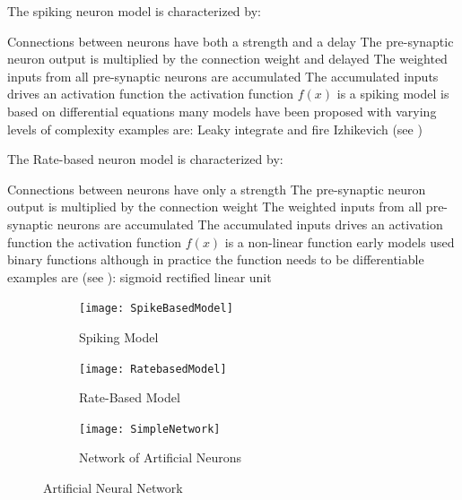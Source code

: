 The spiking neuron model is characterized by:
\begin{outline}
        \1 Connections between neurons have both a strength and a delay
          \2 The pre-synaptic neuron output is multiplied by the connection weight and delayed
        \1 The weighted inputs from all pre-synaptic neurons are accumulated
        \1 The accumulated inputs drives an activation function
          \2 the activation function $f(x)$ is a spiking model is based on differential equations
          \2 many models have been proposed with varying levels of complexity
            \3 examples are:
              \4 Leaky integrate and fire
              \4 Izhikevich \cite{Iz2005} (see )
         
\end{outline}

The Rate-based neuron model is characterized by:
\begin{outline}
        \1 Connections between neurons have only a strength
          \2 The pre-synaptic neuron output is multiplied by the connection weight
        \1 The weighted inputs from all pre-synaptic neurons are accumulated
        \1 The accumulated inputs drives an activation function
          \2 the activation function $f(x)$ is a non-linear function
          \2 early models used binary functions although in practice the function needs to be differentiable
            \3 examples are (see ):
              \4 sigmoid
              \4 rectified linear unit
\end{outline}

\begin{figure}
\centering
\begin{subfigure}{.4\textwidth}
  \centering
  \texttt{[image: SpikeBasedModel]}
  \captionsetup{justification=centering, skip=5pt}
  \caption{Spiking Model}
  \label{fig:simpleNetwork}
\end{subfigure}%
\begin{subfigure}{.4\textwidth}
  \centering
  \texttt{[image: RatebasedModel]}
  \captionsetup{justification=centering, skip=5pt}
  \caption{Rate-Based Model}
  \label{fig:cellContents}
\end{subfigure}
\begin{subfigure}{.9\textwidth}
  \centering
  \texttt{[image: SimpleNetwork]}
  \captionsetup{justification=centering, skip=5pt}
  \caption{Network of Artificial Neurons}
  \label{fig:cellContents}
\end{subfigure}
\captionsetup{justification=centering, skip=2pt}
\caption{Artificial Neural Network}
\label{fig:Artificial Neural Network}
\end{figure}

